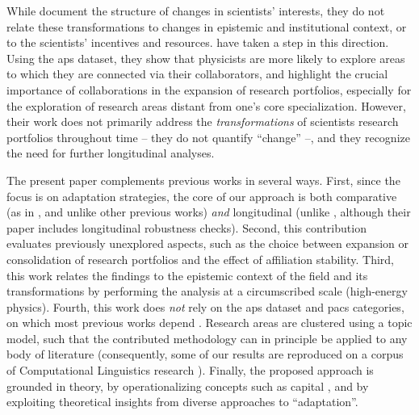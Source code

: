 \documentclass{article}
\begin{document}
While \citep{Jia2017,Aleta2019,Zeng2019} document the structure of changes in scientists' interests, they do not relate these transformations to changes in epistemic and institutional context, or to the scientists' incentives and resources. %
\citet{Tripodi2020} have taken a step in this direction. Using the \gls{aps} dataset, they show that physicists are more likely to explore areas to which they are connected via their collaborators, and highlight the crucial importance of collaborations in the expansion of research portfolios, especially for the exploration of research areas distant from one's core specialization. %
However, their work does not primarily address the \textit{transformations} of scientists research portfolios throughout time -- they do not quantify ``change'' --, and they recognize the need for further longitudinal analyses.

The present paper complements previous works in several ways. First, since the focus is on adaptation strategies, the core of our approach is both comparative (as in \citealt{Tripodi2020}, and unlike other previous works) \textit{and} longitudinal (unlike \citealt{Tripodi2020}, although their paper includes longitudinal robustness checks). Second, this contribution evaluates previously unexplored aspects, such as the choice between expansion or consolidation of research portfolios and the effect of affiliation stability. %
Third, this work relates the findings to the epistemic context of the field and its transformations by performing the analysis at a circumscribed scale (high-energy physics). Fourth, this work does \textit{not} rely on the \gls{aps} dataset and \gls{pacs} categories, on which most previous works depend \citep{Jia2017,Aleta2019,Battiston2019,Tripodi2020,Feifan2023}. Research areas are clustered using a topic model, such that the contributed methodology can in principle be applied to any body of literature (consequently, some of our results are reproduced on a corpus of Computational Linguistics research \citep{acl_anthology_corpus}). Finally, the proposed approach is grounded in theory, by operationalizing concepts such as capital \citep{Bourdieu1980,Bourdieu1986}, and by exploiting theoretical insights from diverse approaches to ``adaptation''.
\end{document}
